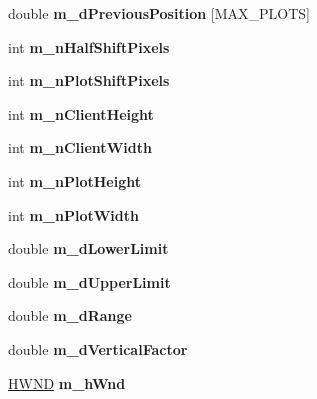 \begin{DoxyCompactItemize}
double {\bfseries m\+\_\+d\+Previous\+Position} \mbox{[}M\+A\+X\+\_\+\+P\+L\+O\+TS\mbox{]}
\item 
\mbox{\label{struct_t_graph_ctrl_a1d9cbeadd0b896be5f5e0325daf41db1}} 
int {\bfseries m\+\_\+n\+Half\+Shift\+Pixels}
\item 
\mbox{\label{struct_t_graph_ctrl_ac8bb59e0181d6b776b0e98742162dae0}} 
int {\bfseries m\+\_\+n\+Plot\+Shift\+Pixels}
\item 
\mbox{\label{struct_t_graph_ctrl_a89669bc07ab1c9b83e0f82ff082e8242}} 
int {\bfseries m\+\_\+n\+Client\+Height}
\item 
\mbox{\label{struct_t_graph_ctrl_ac341fa8efaa903ff36c8d341d61b2c65}} 
int {\bfseries m\+\_\+n\+Client\+Width}
\item 
\mbox{\label{struct_t_graph_ctrl_aa65a26eec14c97d4b1102f4330c4de6d}} 
int {\bfseries m\+\_\+n\+Plot\+Height}
\item 
\mbox{\label{struct_t_graph_ctrl_aa142ecdc65c81a798128bbd3ccd11e11}} 
int {\bfseries m\+\_\+n\+Plot\+Width}
\item 
\mbox{\label{struct_t_graph_ctrl_aea2ffde40cb956875a2899c18d0a4ae8}} 
double {\bfseries m\+\_\+d\+Lower\+Limit}
\item 
\mbox{\label{struct_t_graph_ctrl_a276dc5892cf8ba088cd39f665c299812}} 
double {\bfseries m\+\_\+d\+Upper\+Limit}
\item 
\mbox{\label{struct_t_graph_ctrl_ae3fdd9aa696c5aeb14b7df1aee3ce538}} 
double {\bfseries m\+\_\+d\+Range}
\item 
\mbox{\label{struct_t_graph_ctrl_afec682cf485d4ec4be783d8f2db624d5}} 
double {\bfseries m\+\_\+d\+Vertical\+Factor}
\item 
\mbox{\label{struct_t_graph_ctrl_a658de08b826177d8028e8c11f9d116c8}} 
\hyperlink{interfacevoid}{H\+W\+ND} {\bfseries m\+\_\+h\+Wnd}
\item 

\end{DoxyCompactItemize}
